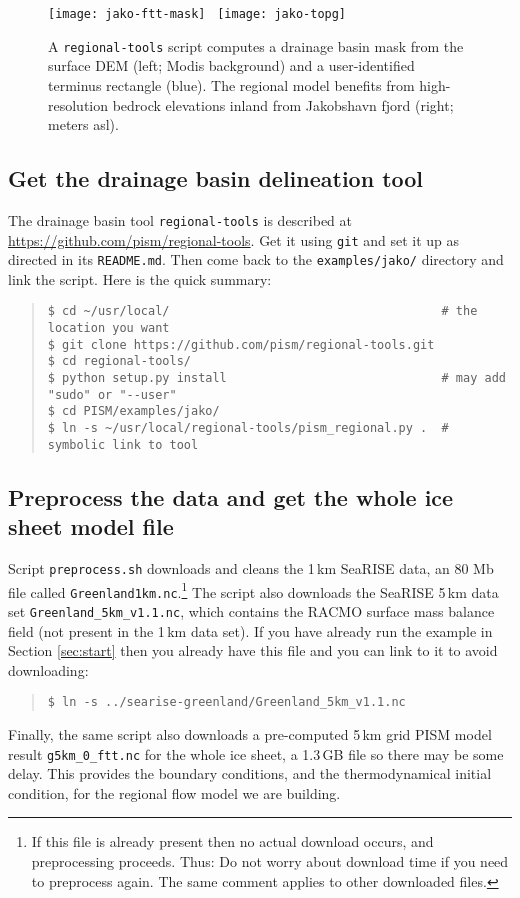 \begin{figure}[ht]
  \centering
  \texttt{[image: jako-ftt-mask]} \, \texttt{[image: jako-topg]}
  \caption{A \texttt{regional-tools} script computes a drainage basin mask from the surface DEM (left; Modis background) and a user-identified terminus rectangle (blue).  The regional model benefits from high-resolution bedrock elevations inland from Jakobshavn fjord (right; meters asl).}
  \label{fig:jako-basin-topg}
\end{figure}


\subsection*{Get the drainage basin delineation tool}
The drainage basin tool \texttt{regional-tools} is described at \url{https://github.com/pism/regional-tools}.  Get it using \texttt{git} and set it up as directed in its \texttt{README.md}.  Then come back to the \texttt{examples/jako/} directory and link the script.  Here is the quick summary:
\begin{quote}\small
\begin{verbatim}
$ cd ~/usr/local/                                      # the location you want
$ git clone https://github.com/pism/regional-tools.git
$ cd regional-tools/
$ python setup.py install                              # may add "sudo" or "--user"
$ cd PISM/examples/jako/
$ ln -s ~/usr/local/regional-tools/pism_regional.py .  # symbolic link to tool
\end{verbatim}
\normalsize\end{quote}

\subsection*{Preprocess the data and get the whole ice sheet model file}
Script \texttt{preprocess.sh} downloads and cleans the 1\,km SeaRISE data, an 80 Mb file called \texttt{Greenland1km.nc}.\footnote{If this file is already present then no actual download occurs, and preprocessing proceeds.  Thus:  Do not worry about download time if you need to preprocess again.  The same comment applies to other downloaded files.}  The script also downloads the SeaRISE 5\,km data set \texttt{Greenland_5km_v1.1.nc}, which contains the RACMO surface mass balance field (not present in the 1\,km data set).  If you have already run the example in Section \ref{sec:start} then you already have this file and you can link to it to avoid downloading:
\begin{quote}\small
\begin{verbatim}
$ ln -s ../searise-greenland/Greenland_5km_v1.1.nc
\end{verbatim}
\normalsize\end{quote}
Finally, the same script also downloads a pre-computed 5\,km grid PISM model result \texttt{g5km_0_ftt.nc} for the whole ice sheet, a 1.3\,GB file so there may be some delay.  This provides the boundary conditions, and the thermodynamical initial condition, for the regional flow model we are building.

